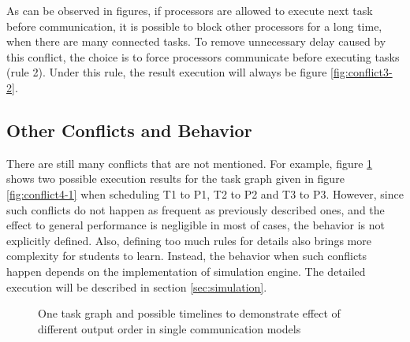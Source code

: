 \documentclass[msc,deptreport, cs]{infthesis}
\begin{document}
As can be observed in figures, if processors are allowed to execute next task before communication, it is possible to block other processors for a long time, when there are many connected tasks. To remove unnecessary delay caused by this conflict, the choice is to force processors communicate before executing tasks (rule 2). Under this rule, the result execution will always be figure \ref{fig:conflict3-2}.

\subsection{Other Conflicts and Behavior} \label{sec:conflict}

There are still many conflicts that are not mentioned. For example, figure \ref{fig:conflict4} shows two possible execution results for the task graph given in figure \ref{fig:conflict4-1} when scheduling T1 to P1, T2 to P2 and T3 to P3. However, since such conflicts do not happen as frequent as previously described ones, and the effect to general performance is negligible in most of cases, the behavior is not explicitly defined. Also, defining too much rules for details also brings more complexity for students to learn. Instead, the behavior when such conflicts happen depends on the implementation of simulation engine. The detailed execution will be described in section \ref{sec:simulation}.

\begin{figure}[!htb]
  \centering
   \hspace{0.5em}
   \hspace{0.5em}
  \caption{One task graph and possible timelines to demonstrate effect of different output order in single communication models}
  \label{fig:conflict4}
\end{figure}
\end{document}
